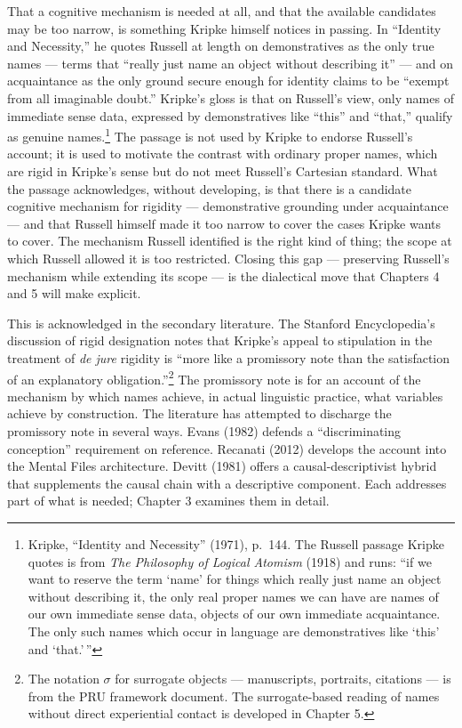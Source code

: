 \documentclass[12pt,a4paper]{article}
\begin{document}
That a cognitive mechanism is needed at all, and that the available candidates may be too narrow, is something Kripke himself notices in passing. In ``Identity and Necessity,'' he quotes Russell at length on demonstratives as the only true names --- terms that ``really just name an object without describing it'' --- and on acquaintance as the only ground secure enough for identity claims to be ``exempt from all imaginable doubt.'' Kripke's gloss is that on Russell's view, only names of immediate sense data, expressed by demonstratives like ``this'' and ``that,'' qualify as genuine names.\footnote{Kripke, ``Identity and Necessity'' (1971), p.~144. The Russell passage Kripke quotes is from \emph{The Philosophy of Logical Atomism} (1918) and runs: ``if we want to reserve the term `name' for things which really just name an object without describing it, the only real proper names we can have are names of our own immediate sense data, objects of our own immediate acquaintance. The only such names which occur in language are demonstratives like `this' and `that.'\,''} The passage is not used by Kripke to endorse Russell's account; it is used to motivate the contrast with ordinary proper names, which are rigid in Kripke's sense but do not meet Russell's Cartesian standard. What the passage acknowledges, without developing, is that there is a candidate cognitive mechanism for rigidity --- demonstrative grounding under acquaintance --- and that Russell himself made it too narrow to cover the cases Kripke wants to cover. The mechanism Russell identified is the right kind of thing; the scope at which Russell allowed it is too restricted. Closing this gap --- preserving Russell's mechanism while extending its scope --- is the dialectical move that Chapters 4 and 5 will make explicit.

This is acknowledged in the secondary literature. The Stanford Encyclopedia's discussion of rigid designation notes that Kripke's appeal to stipulation in the treatment of \emph{de jure} rigidity is ``more like a promissory note than the satisfaction of an explanatory obligation.''\footnote{The notation \(\sigma\) for surrogate objects --- manuscripts, portraits, citations --- is from the PRU framework document. The surrogate-based reading of names without direct experiential contact is developed in Chapter 5.} The promissory note is for an account of the mechanism by which names achieve, in actual linguistic practice, what variables achieve by construction. The literature has attempted to discharge the promissory note in several ways. Evans (1982) defends a ``discriminating conception'' requirement on reference. Recanati (2012) develops the account into the Mental Files architecture. Devitt (1981) offers a causal-descriptivist hybrid that supplements the causal chain with a descriptive component. Each addresses part of what is needed; Chapter 3 examines them in detail.
\end{document}
